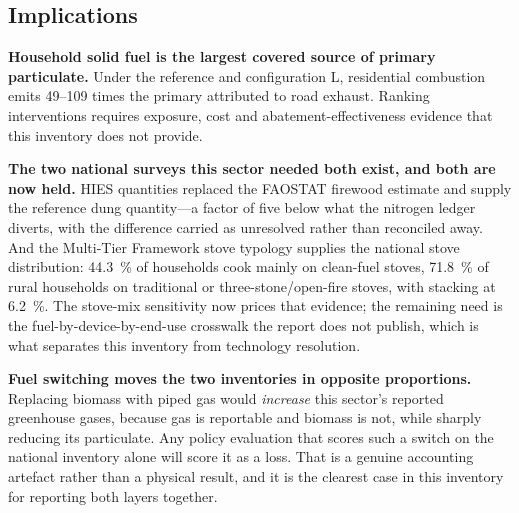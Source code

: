 \subsection{Implications}

\textbf{Household solid fuel is the largest covered source of primary particulate.} Under
the reference and configuration L, residential combustion emits
\numrange{49}{109} times the primary \PM{} attributed to road exhaust. Ranking interventions
requires exposure, cost and abatement-effectiveness evidence that this inventory does not
provide.

\textbf{The two national surveys this sector needed both exist, and both are now held.}
HIES quantities replaced the FAOSTAT firewood estimate and supply the reference dung
quantity---a factor of five below what the nitrogen ledger diverts, with the difference
carried as unresolved rather than reconciled away. And the Multi-Tier Framework stove typology
\citep{worldbank2024mtf} supplies the national stove distribution: \SI{44.3}{\percent} of households cook mainly on clean-fuel
stoves, \SI{71.8}{\percent} of rural households on traditional or three-stone/open-fire
stoves, with stacking at \SI{6.2}{\percent}. The stove-mix sensitivity now prices that
evidence; the remaining need is the fuel-by-device-by-end-use crosswalk the report does
not publish, which is what separates this inventory from technology resolution.

\textbf{Fuel switching moves the two inventories in opposite proportions.} Replacing biomass
with piped gas would \emph{increase} this sector's reported greenhouse gases, because gas
\COtwo{} is reportable and biomass \COtwo{} is not, while sharply reducing its particulate. Any
policy evaluation that scores such a switch on the national inventory alone will score it as a
loss. That is a genuine accounting artefact rather than a physical result, and it is the
clearest case in this inventory for reporting both layers together.
